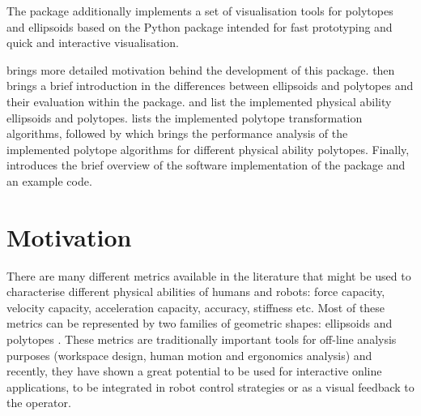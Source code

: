 The package additionally implements a set of visualisation tools for polytopes and ellipsoids based on the Python package  intended for fast prototyping and quick and interactive visualisation.

 brings more detailed motivation behind the development of this package.  then brings a brief introduction in the differences between ellipsoids and polytopes and their evaluation within the package.  and  list the implemented physical ability ellipsoids and polytopes.  lists the implemented polytope transformation algorithms, followed by  which brings the performance analysis of the implemented polytope algorithms for different physical ability polytopes. Finally,  introduces the brief overview of the software implementation of the package and an example code.

\section{Motivation}
\label{sec:pycpacity_motivation}


There are many different metrics available in the literature that might be used to characterise different physical abilities of humans and robots: force capacity, velocity capacity, acceleration capacity, accuracy, stiffness etc. Most of these metrics can be represented by two families of geometric shapes: ellipsoids \cite{yoshikawa1985manipulability} and polytopes \cite{chiacchio_evaluation_1996}. These metrics are traditionally important tools for off-line analysis purposes (workspace design, human motion and ergonomics analysis) and recently, they have shown a great potential to be used for interactive online applications, to be integrated in robot control strategies or as a visual feedback to the operator. 

